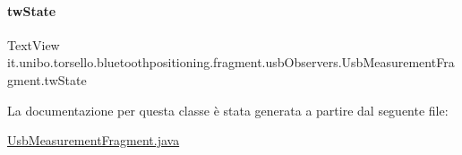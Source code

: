 \hypertarget{classit_1_1unibo_1_1torsello_1_1bluetoothpositioning_1_1fragment_1_1usbObservers_1_1UsbMeasurementFragment_a5ce90223eb1d85ed6dffa5ef36d7ff69_a5ce90223eb1d85ed6dffa5ef36d7ff69}{}\label{classit_1_1unibo_1_1torsello_1_1bluetoothpositioning_1_1fragment_1_1usbObservers_1_1UsbMeasurementFragment_a5ce90223eb1d85ed6dffa5ef36d7ff69_a5ce90223eb1d85ed6dffa5ef36d7ff69} 
\paragraph{\texorpdfstring{tw\+State}{twState}}
{\footnotesize\ttfamily Text\+View it.\+unibo.\+torsello.\+bluetoothpositioning.\+fragment.\+usb\+Observers.\+Usb\+Measurement\+Fragment.\+tw\+State\hspace{0.3cm}{\ttfamily [private]}}



La documentazione per questa classe è stata generata a partire dal seguente file\+:\begin{DoxyCompactItemize}
\item 
\hyperlink{UsbMeasurementFragment_8java}{Usb\+Measurement\+Fragment.\+java}\end{DoxyCompactItemize}
